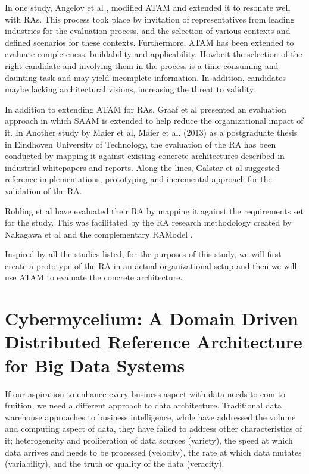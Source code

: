 \documentclass[review]{elsarticle}
\begin{document}
In one study, Angelov et al \cite{angelov2008towards}, modified ATAM and extended it to resonate well with RAs. This process took place by invitation of representatives from leading industries for the evaluation process, and the selection of various contexts and defined scenarios for these contexts. Furthermore, ATAM has been extended to evaluate completeness, buildability and applicability. Howbeit the selection of the right candidate and involving them in the process is a time-consuming and daunting task and may yield incomplete information. In addition, candidates maybe lacking architectural visions, increasing the threat to validity. 

In addition to extending ATAM for RAs, Graaf et al \cite{graaf2005evaluating} presented an evaluation approach in which SAAM is extended to help reduce the organizational impact of it. In Another study by Maier et al, Maier et al. (2013) as a postgraduate thesis in Eindhoven University of Technology, the evaluation of the RA has been conducted by mapping it against existing concrete architectures described in industrial whitepapers and reports. Along the lines, Galstar et al \cite{galster2011empirically} suggested reference implementations, prototyping and incremental approach for the validation of the RA. 

Rohling et al \cite{rohling2019reference} have evaluated their RA by mapping it against the requirements set for the study. This was facilitated by the RA research methodology created by Nakagawa et al \cite{Nakagawa} and the complementary RAModel \cite{nakagawa2012ramodel}.

Inspired by all the studies listed, for the purposes of this study, we will first create a prototype of the RA in an actual organizational setup and then we will use ATAM to evaluate the concrete architecture. 

\section{Cybermycelium: A Domain Driven Distributed Reference Architecture for Big Data Systems}

If our aspiration to enhance every business aspect with data needs to com to fruition, we need a different approach to data architecture. Traditional data warehouse approaches to business intelligence, while have addressed the volume and computing aspect of data, they have failed to address other characteristics of it; heterogeneity and proliferation of data sources (variety), the speed at which data arrives and needs to be processed (velocity), the rate at which data mutates (variability), and the truth or quality of the data (veracity).
\end{document}
